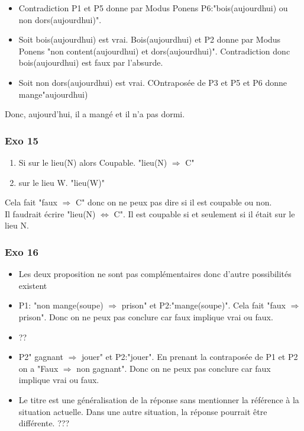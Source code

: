 \documentclass[]{book}
\theoremstyle{definition}
\begin{document}
\begin{itemize}
\item Contradiction P1 et P5 donne par Modus Ponens P6:"bois(aujourdhui) ou non dors(aujourdhui)". 
\item Soit bois(aujourdhui) est vrai. Bois(aujourdhui) et P2 donne par Modus Ponens "non content(aujourdhui) et dors(aujourdhui)". Contradiction donc bois(aujourdhui) est faux par l'absurde.
\item Soit non dors(aujourdhui) est vrai. COntrapos\'ee de P3 et P5 et P6 donne mange"aujourdhui)
\end{itemize}
Donc, aujourd'hui, il a mang\'e et il n'a pas dormi.

\subsubsection*{Exo 15}
\begin{enumerate}[P1:]
\item Si sur le lieu(N) alors Coupable. "lieu(N) $\Rightarrow$ C"
\item sur le lieu W. "lieu(W)"
\end{enumerate}

Cela fait "faux $\Rightarrow$ C" donc on ne peux pas dire si il est coupable ou non.\\
Il faudrait \'ecrire "lieu(N) $\Leftrightarrow$ C". Il est coupable si et seulement si il \'etait sur le lieu N.

\subsubsection*{Exo 16}
\begin{itemize}
\item Les deux proposition ne sont pas compl\'ementaires donc d'autre possibilit\'es existent
\item P1: "non mange(soupe) $\Rightarrow$ prison" et P2:"mange(soupe)". Cela fait "faux $\Rightarrow$ prison". Donc on ne peux pas conclure car faux implique vrai ou faux.
\item ??
\item P2" gagnant $\Rightarrow$ jouer" et P2:"jouer". En prenant la contrapos\'ee de P1 et P2 on a "Faux $\Rightarrow$ non gagnant". Donc on ne peux pas conclure car faux implique vrai ou faux.
\item Le titre est une g\'en\'eralisation de la r\'eponse sans mentionner la r\'ef\'erence \`a la situation actuelle. Dans une autre situation, la r\'eponse pourrait \^etre diff\'erente. ???
\end{itemize}
\end{document}
